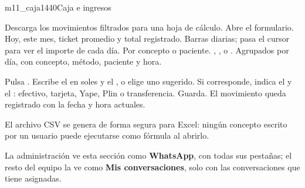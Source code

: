 \documentclass[11pt]{article}
\begin{document}
\label{sec:caja}


\begin{pantalla}{m11_caja}{1440}{Caja e ingresos}
\end{pantalla}

\begin{leyenda}
   Descarga los movimientos filtrados para una hoja de cálculo.
   Abre el formulario.
   Hoy, este mes, ticket promedio y total registrado.
   Barras diarias; pasa el cursor para ver el importe de cada día.
   Por concepto o paciente.
   , ,  o .
   Agrupados por día, con concepto, método, paciente y hora.
\end{leyenda}

\begin{pasos}
  \paso Pulsa  .
  \paso Escribe el  en soles y el , o elige uno sugerido.
  \paso Si corresponde, indica el  y el : efectivo, tarjeta, Yape, Plin o transferencia.
  \paso Guarda. El movimiento queda registrado con la fecha y hora actuales.
\end{pasos}

\begin{sdnota}
El archivo CSV se genera de forma segura para Excel: ningún concepto escrito por un usuario puede ejecutarse como fórmula al abrirlo.
\end{sdnota}

\label{sec:whatsapp}


La administración ve esta sección como \textbf{WhatsApp}, con todas sus pestañas; el resto del equipo la ve como \textbf{Mis conversaciones}, solo con las conversaciones que tiene asignadas.
\end{document}
